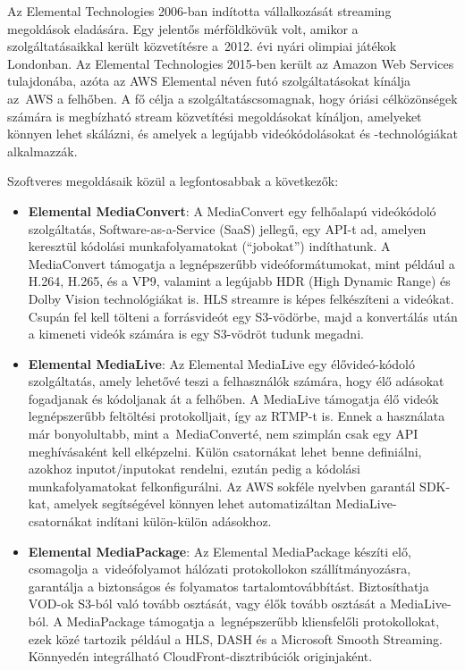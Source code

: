 Az Elemental Technologies 2006-ban indította vállalkozását streaming megoldások eladására. Egy jelentős mérföldkövük volt, amikor a szolgáltatásaikkal került közvetítésre a~2012. évi nyári olimpiai játékok Londonban. Az Elemental Technologies 2015-ben került az Amazon Web Services tulajdonába, azóta az AWS Elemental néven futó szolgáltatásokat kínálja az~AWS a felhőben. A fő célja a szolgáltatáscsomagnak, hogy óriási célközönségek számára is megbízható stream közvetítési megoldásokat kínáljon, amelyeket könnyen lehet skálázni, és amelyek a legújabb videókódolásokat és -technológiákat alkalmazzák.\cite{Elemental}

Szoftveres megoldásaik közül a legfontosabbak a következők:

\begin{itemize}
  \item \textbf{Elemental MediaConvert}: A MediaConvert egy felhőalapú videókódoló szolgáltatás, Software-as-a-Service (SaaS) jellegű, egy API-t ad, amelyen keresztül kódolási munkafolyamatokat (``jobokat'') indíthatunk. A MediaConvert támogatja a legnépszerűbb videóformátumokat, mint például a H.264, H.265, és a VP9, valamint a legújabb HDR (High Dynamic Range) és Dolby Vision technológiákat is. HLS streamre is képes felkészíteni a videókat. Csupán fel kell tölteni a forrásvideót egy S3-vödörbe, majd a konvertálás után a kimeneti videók számára is egy S3-vödröt tudunk megadni.
  \item \textbf{Elemental MediaLive}: Az Elemental MediaLive egy élővideó-kódoló szolgáltatás, amely lehetővé teszi a felhasználók számára, hogy élő adásokat fogadjanak és kódoljanak át a felhőben. A MediaLive támogatja élő videók legnépszerűbb feltöltési protokolljait, így az RTMP-t is. Ennek a használata már bonyolultabb, mint a~MediaConverté, nem szimplán csak egy API meghívásaként kell elképzelni. Külön csatornákat lehet benne definiálni, azokhoz inputot/inputokat rendelni, ezután pedig a kódolási munkafolyamatokat felkonfigurálni. Az AWS sokféle nyelvben garantál SDK-kat, amelyek segítségével könnyen lehet automatizáltan MediaLive-csatornákat indítani külön-külön adásokhoz.
  \item \textbf{Elemental MediaPackage}: Az Elemental MediaPackage készíti elő, csomagolja a~videófolyamot hálózati protokollokon szállítmányozásra, garantálja a biztonságos és folyamatos tartalomtovábbítást. Biztosíthatja VOD-ok S3-ból való tovább osztását, vagy élők tovább osztását a MediaLive-ból. A MediaPackage támogatja a~legnépszerűbb kliensfelőli protokollokat, ezek közé tartozik például a HLS, DASH és a Microsoft Smooth Streaming. Könnyedén integrálható CloudFront-disztribúciók originjaként.
\end{itemize}

